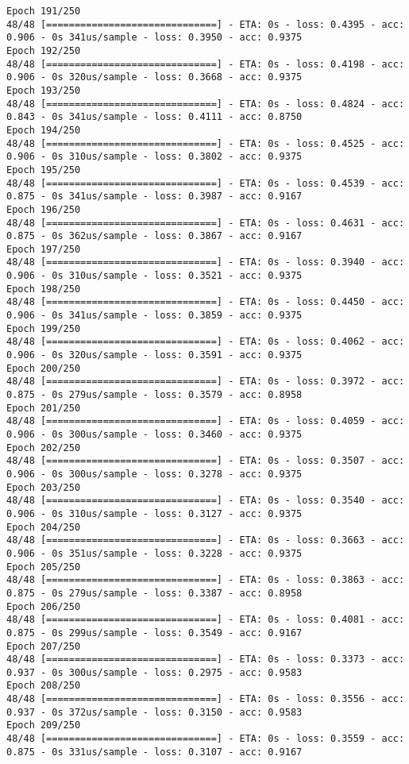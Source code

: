 \documentclass[11pt]{article}
\begin{document}
\begin{Verbatim}[commandchars=\\\{\}]
Epoch 191/250
48/48 [==============================] - ETA: 0s - loss: 0.4395 - acc: 0.906 - 0s 341us/sample - loss: 0.3950 - acc: 0.9375
Epoch 192/250
48/48 [==============================] - ETA: 0s - loss: 0.4198 - acc: 0.906 - 0s 320us/sample - loss: 0.3668 - acc: 0.9375
Epoch 193/250
48/48 [==============================] - ETA: 0s - loss: 0.4824 - acc: 0.843 - 0s 341us/sample - loss: 0.4111 - acc: 0.8750
Epoch 194/250
48/48 [==============================] - ETA: 0s - loss: 0.4525 - acc: 0.906 - 0s 310us/sample - loss: 0.3802 - acc: 0.9375
Epoch 195/250
48/48 [==============================] - ETA: 0s - loss: 0.4539 - acc: 0.875 - 0s 341us/sample - loss: 0.3987 - acc: 0.9167
Epoch 196/250
48/48 [==============================] - ETA: 0s - loss: 0.4631 - acc: 0.875 - 0s 362us/sample - loss: 0.3867 - acc: 0.9167
Epoch 197/250
48/48 [==============================] - ETA: 0s - loss: 0.3940 - acc: 0.906 - 0s 310us/sample - loss: 0.3521 - acc: 0.9375
Epoch 198/250
48/48 [==============================] - ETA: 0s - loss: 0.4450 - acc: 0.906 - 0s 341us/sample - loss: 0.3859 - acc: 0.9375
Epoch 199/250
48/48 [==============================] - ETA: 0s - loss: 0.4062 - acc: 0.906 - 0s 320us/sample - loss: 0.3591 - acc: 0.9375
Epoch 200/250
48/48 [==============================] - ETA: 0s - loss: 0.3972 - acc: 0.875 - 0s 279us/sample - loss: 0.3579 - acc: 0.8958
Epoch 201/250
48/48 [==============================] - ETA: 0s - loss: 0.4059 - acc: 0.906 - 0s 300us/sample - loss: 0.3460 - acc: 0.9375
Epoch 202/250
48/48 [==============================] - ETA: 0s - loss: 0.3507 - acc: 0.906 - 0s 300us/sample - loss: 0.3278 - acc: 0.9375
Epoch 203/250
48/48 [==============================] - ETA: 0s - loss: 0.3540 - acc: 0.906 - 0s 310us/sample - loss: 0.3127 - acc: 0.9375
Epoch 204/250
48/48 [==============================] - ETA: 0s - loss: 0.3663 - acc: 0.906 - 0s 351us/sample - loss: 0.3228 - acc: 0.9375
Epoch 205/250
48/48 [==============================] - ETA: 0s - loss: 0.3863 - acc: 0.875 - 0s 279us/sample - loss: 0.3387 - acc: 0.8958
Epoch 206/250
48/48 [==============================] - ETA: 0s - loss: 0.4081 - acc: 0.875 - 0s 299us/sample - loss: 0.3549 - acc: 0.9167
Epoch 207/250
48/48 [==============================] - ETA: 0s - loss: 0.3373 - acc: 0.937 - 0s 300us/sample - loss: 0.2975 - acc: 0.9583
Epoch 208/250
48/48 [==============================] - ETA: 0s - loss: 0.3556 - acc: 0.937 - 0s 372us/sample - loss: 0.3150 - acc: 0.9583
Epoch 209/250
48/48 [==============================] - ETA: 0s - loss: 0.3559 - acc: 0.875 - 0s 331us/sample - loss: 0.3107 - acc: 0.9167

\end{Verbatim}
\end{document}
